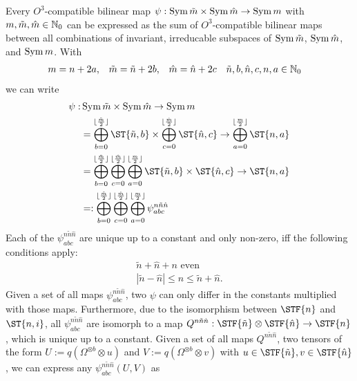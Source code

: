 \begin{lemma}\label{lem:bilinearMapDecomp}
	Every $O^3$-compatible bilinear map $\psi: \operatorname{Sym}{\tilde{m}}\times\operatorname{Sym}{\hat{m}}\to\operatorname{Sym}{m}$ with $m,\tilde{m},\hat{m}\in\mathbb{N}_0$  can be expressed as the sum of $O^3$-compatible bilinear maps between all combinations of invariant, irreducable subspaces of $\operatorname{Sym}{\tilde{m}}$, $\operatorname{Sym}{\hat{m}}$, and $\operatorname{Sym}{m}$. With
	\begin{align*}
		m&=n+2a, & \tilde{m}&=\tilde{n}+2b, & \hat{m} &= \hat{n} +2c & 	\tilde{n},b,\hat{n},c,n,a &\in \mathbb{N}_0
	\end{align*}
	we can write
	\begin{align*}
		\psi: &\Sym{\tilde{m}}\times\Sym{\hat{m}}\to\Sym{m}
		\\
		& = \bigoplus_{b=0}^{\lfloor\frac{\tilde{m}}{2}\rfloor}\ST{\tilde{n},b} \times \bigoplus_{c=0}^{\lfloor\frac{\hat{m}}{2}\rfloor}\ST{\hat{n},c} \to \bigoplus_{a=0}^{\lfloor\frac{m}{2}\rfloor}\ST{n,a}
		\\
		&=
		\bigoplus_{b=0}^{\lfloor\frac{\tilde{m}}{2}\rfloor} \bigoplus_{c=0}^{\lfloor\frac{\hat{m}}{2}\rfloor}
		\bigoplus_{a=0}^{\lfloor\frac{m}{2}\rfloor}
		\ST{\tilde{n},b} \times \ST{\hat{n},c} \to \ST{n,a}\\
		&=:\bigoplus_{b=0}^{\lfloor\frac{\tilde{m}}{2}\rfloor} \bigoplus_{c=0}^{\lfloor\frac{\hat{m}}{2}\rfloor}
		\bigoplus_{a=0}^{\lfloor\frac{m}{2}\rfloor} \psi_{abc}^{n\tilde{n}\hat{n}}
	\end{align*}
	Each of the $\psi_{abc}^{n\tilde{n}\hat{n}}$ are unique up to a constant and only non-zero, iff the following conditions apply:
	\begin{align*}
		\tilde{n}+\hat{n} + n \text{ even}\\
		|\tilde{n}-\hat{n}|\leq n\leq \tilde{n}+\hat{n}.
	\end{align*}
	Given a set of all maps $\psi_{abc}^{n\tilde{n}\hat{n}}$, two $\psi$ can only differ in the constants multiplied with those maps. Furthermore, due to the isomorphism between $\STF{n}$ and $\ST{n,i}$, all $\psi_{abc}^{n\tilde{n}\hat{n}}$  are isomorph to a map $Q^{n\tilde{n}\hat{n}}: \STF{\tilde{n}}\otimes\STF{\hat{n}}\to\STF{n}$, which is unique up to a constant. 
	Given a set of all maps $Q^{n\tilde{n}\hat{n}}$, two tensors of the form $U:=q\left(\Omega^{\otimes b}\otimes u\right)$ and $V:=q\left(\Omega^{\otimes b}\otimes v\right)$ with $u\in\STF{\tilde{n}},v\in\STF{\hat{n}}$, we can express any $\psi_{abc}^{n\tilde{n}\hat{n}}(U,V)$ as
	

\end{lemma}
